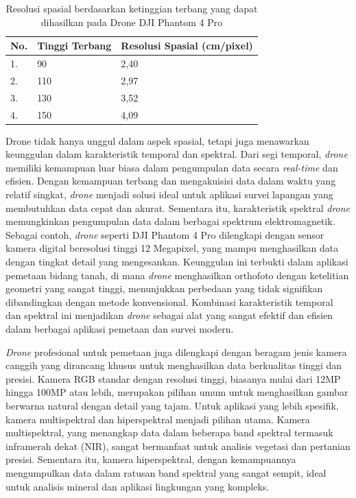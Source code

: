 \begin{table}[H]
\centering
\caption{Resolusi spasial berdasarkan ketinggian terbang yang dapat dihasilkan pada Drone DJI Phantom 4 Pro \citep{hernina2019analisis}}
\label{resolusispasial}
\begin{tabular}{|l|l|l|}
\hline
\textbf{No.} & \textbf{Tinggi Terbang} & \textbf{Resolusi Spasial (cm/pixel)} \\ \hline
1.           & 90                      & 2,40                                 \\ \hline
2.           & 110                     & 2,97                                 \\ \hline
3.           & 130                     & 3,52                                 \\ \hline
4.           & 150                     & 4,09                                 \\ \hline
\end{tabular}
\end{table}

\par Drone tidak hanya unggul dalam aspek spasial, tetapi juga menawarkan keunggulan dalam karakteristik temporal dan spektral. Dari segi temporal, \textit{drone} memiliki kemampuan luar biasa dalam pengumpulan data secara \textit{real-time} dan efisien. Dengan kemampuan terbang dan mengakuisisi data dalam waktu yang relatif singkat, \textit{drone} menjadi solusi ideal untuk aplikasi survei lapangan yang membutuhkan data cepat dan akurat. Sementara itu, karakteristik spektral \textit{drone} memungkinkan pengumpulan data dalam berbagai spektrum elektromagnetik. Sebagai contoh, \textit{drone} seperti DJI Phantom 4 Pro dilengkapi dengan sensor kamera digital beresolusi tinggi 12 Megapixel, yang mampu menghasilkan data dengan tingkat detail yang mengesankan. Keunggulan ini terbukti dalam aplikasi pemetaan bidang tanah, di mana \textit{drone} menghasilkan orthofoto dengan ketelitian geometri yang sangat tinggi, menunjukkan perbedaan yang tidak signifikan dibandingkan dengan metode konvensional. Kombinasi karakteristik temporal dan spektral ini menjadikan \textit{drone} sebagai alat yang sangat efektif dan efisien dalam berbagai aplikasi pemetaan dan survei modern.

\textit{Drone} profesional untuk pemetaan juga dilengkapi dengan beragam jenis kamera canggih yang dirancang khusus untuk menghasilkan data berkualitas tinggi dan presisi. Kamera RGB standar dengan resolusi tinggi, biasanya mulai dari 12MP hingga 100MP atau lebih, merupakan pilihan umum untuk menghasilkan gambar berwarna natural dengan detail yang tajam. Untuk aplikasi yang lebih spesifik, kamera multispektral dan hiperspektral menjadi pilihan utama. Kamera multispektral, yang menangkap data dalam beberapa band spektral termasuk inframerah dekat (NIR), sangat bermanfaat untuk analisis vegetasi dan pertanian presisi. Sementara itu, kamera hiperspektral, dengan kemampuannya mengumpulkan data dalam ratusan band spektral yang sangat sempit, ideal untuk analisis mineral dan aplikasi lingkungan yang kompleks.

